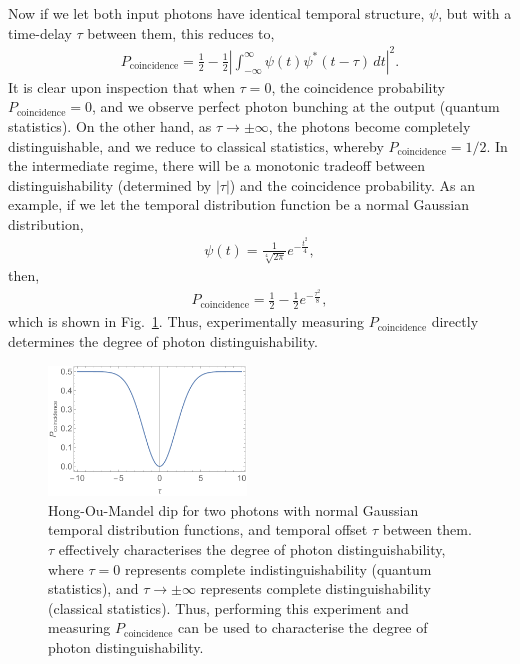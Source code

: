 Now if we let both input photons have identical temporal structure, $\psi$, but with a time-delay $\tau$ between them, this reduces to,
\begin{align}
P_\mathrm{coincidence} = \frac{1}{2} - \frac{1}{2} \left| \int^\infty_{-\infty} \psi(t)\psi^*(t-\tau)\,dt\right|^2.
\end{align}
It is clear upon inspection that when \mbox{$\tau=0$}, the coincidence probability \mbox{$P_\mathrm{coincidence}=0$}, and we observe perfect photon bunching at the output (quantum statistics). On the other hand, as \mbox{$\tau\to\pm\infty$}, the photons become completely distinguishable, and we reduce to classical statistics, whereby \mbox{$P_\mathrm{coincidence}=1/2$}. In the intermediate regime, there will be a monotonic tradeoff between distinguishability (determined by $|\tau|$) and the coincidence probability. As an example, if we let the temporal distribution function be a normal Gaussian distribution,
\begin{align}
\psi(t) = \frac{1}{\sqrt[4]{2\pi}}e^{-\frac{t^2}{4}},
\end{align}
then,
\begin{align}
P_\mathrm{coincidence} = \frac{1}{2} - \frac{1}{2} e^{-\frac{\tau^2}{8}},
\end{align}
which is shown in Fig.~\ref{fig:HOM_dip}. Thus, experimentally measuring $P_\mathrm{coincidence}$ directly determines the degree of photon distinguishability.

\begin{figure}[htpb]
\includegraphics[width=0.47\textwidth]{HOM_dip}
\caption{Hong-Ou-Mandel dip for two photons with normal Gaussian temporal distribution functions, and temporal offset $\tau$ between them. $\tau$ effectively characterises the degree of photon distinguishability, where \mbox{$\tau=0$} represents complete indistinguishability (quantum statistics), and \mbox{$\tau\to\pm\infty$} represents complete distinguishability (classical statistics). Thus, performing this experiment and measuring $P_\mathrm{coincidence}$ can be used to characterise the degree of photon distinguishability.} \label{fig:HOM_dip}
\end{figure}

